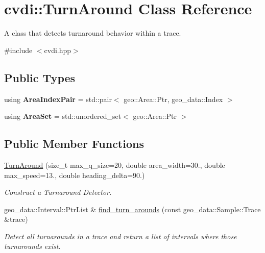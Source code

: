 \hypertarget{classcvdi_1_1TurnAround}{}\section{cvdi\+:\+:Turn\+Around Class Reference}
\label{classcvdi_1_1TurnAround}


A class that detects turnaround behavior within a trace.  




{\ttfamily \#include $<$cvdi.\+hpp$>$}

\subsection*{Public Types}
\begin{DoxyCompactItemize}
\item 
using {\bfseries Area\+Index\+Pair} = std\+::pair$<$ geo\+::\+Area\+::\+Ptr, geo\+\_\+data\+::\+Index $>$\hypertarget{classcvdi_1_1TurnAround_aea706203eade818f580d5ea0675944ae}{}\label{classcvdi_1_1TurnAround_aea706203eade818f580d5ea0675944ae}

\item 
using {\bfseries Area\+Set} = std\+::unordered\+\_\+set$<$ geo\+::\+Area\+::\+Ptr $>$\hypertarget{classcvdi_1_1TurnAround_aea38a85d815e06d807bbc0d007a9ddaa}{}\label{classcvdi_1_1TurnAround_aea38a85d815e06d807bbc0d007a9ddaa}

\end{DoxyCompactItemize}
\subsection*{Public Member Functions}
\begin{DoxyCompactItemize}
\item 
\hyperlink{classcvdi_1_1TurnAround_ac899f9f056bc034bc1cd601a9fb007ad}{Turn\+Around} (size\+\_\+t max\+\_\+q\+\_\+size=20, double area\+\_\+width=30., double max\+\_\+speed=13., double heading\+\_\+delta=90.)
\begin{DoxyCompactList}\small\item\em Construct a Turnaround Detector. \end{DoxyCompactList}\item 
geo\+\_\+data\+::\+Interval\+::\+Ptr\+List \& \hyperlink{classcvdi_1_1TurnAround_aa8ecb499671af73dcd9d5b9b1d73b73d}{find\+\_\+turn\+\_\+arounds} (const geo\+\_\+data\+::\+Sample\+::\+Trace \&trace)
\begin{DoxyCompactList}\small\item\em Detect all turnarounds in a trace and return a list of intervals where those turnarounds exist. \end{DoxyCompactList}\end{DoxyCompactItemize}
